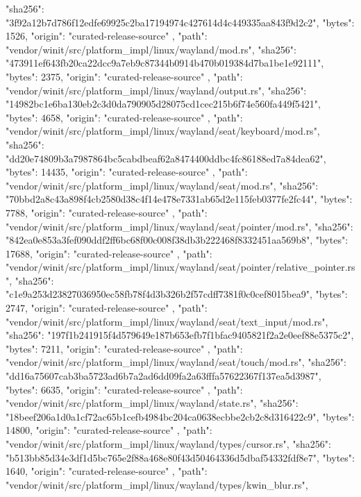 {{      "sha256": "3f92a12b7d786f12edfe69925c2ba17194974c427614d4c449335aa843f9d2c2",
      "bytes": 1526,
      "origin": "curated-release-source"
    },
    {
      "path": "vendor/winit/src/platform_impl/linux/wayland/mod.rs",
      "sha256": "473911ef643fb20ca22dcc9a7eb9c87344b0914b470b019384d7ba1be1e92111",
      "bytes": 2375,
      "origin": "curated-release-source"
    },
    {
      "path": "vendor/winit/src/platform_impl/linux/wayland/output.rs",
      "sha256": "14982bc1e6ba130eb2c3d0da790905d28075cd1cec215b6f74e560fa449f5421",
      "bytes": 4658,
      "origin": "curated-release-source"
    },
    {
      "path": "vendor/winit/src/platform_impl/linux/wayland/seat/keyboard/mod.rs",
      "sha256": "dd20e74809b3a7987864bc5cabdbeaf62a8474400ddbc4fc86188ed7a84dea62",
      "bytes": 14435,
      "origin": "curated-release-source"
    },
    {
      "path": "vendor/winit/src/platform_impl/linux/wayland/seat/mod.rs",
      "sha256": "70bbd2a8c43a898f4cb2580d38c4f14e478e7331ab65d2e115feb0377fe2fc44",
      "bytes": 7788,
      "origin": "curated-release-source"
    },
    {
      "path": "vendor/winit/src/platform_impl/linux/wayland/seat/pointer/mod.rs",
      "sha256": "842ea0e853a3fef090ddf2ff6bc68f00c008f38db3b222468f8332451aa569b8",
      "bytes": 17688,
      "origin": "curated-release-source"
    },
    {
      "path": "vendor/winit/src/platform_impl/linux/wayland/seat/pointer/relative_pointer.rs",
      "sha256": "c1e9a253d23827036950ec58fb78f4d3b326b2f57cdff7381f0c0cef8015bea9",
      "bytes": 2747,
      "origin": "curated-release-source"
    },
    {
      "path": "vendor/winit/src/platform_impl/linux/wayland/seat/text_input/mod.rs",
      "sha256": "197f1b241915f4d579649e187b653efb7f1bfac9405821f2a2e0eef88e5375c2",
      "bytes": 7211,
      "origin": "curated-release-source"
    },
    {
      "path": "vendor/winit/src/platform_impl/linux/wayland/seat/touch/mod.rs",
      "sha256": "dd16a75607cab3ba5723ad6b7a2ad6dd09fa2a63fffa57622367f137ea5d3987",
      "bytes": 6635,
      "origin": "curated-release-source"
    },
    {
      "path": "vendor/winit/src/platform_impl/linux/wayland/state.rs",
      "sha256": "18beef206a1d0a1cf72ac65b1cefb4984bc204ca0638ecbbe2cb2c8d316422c9",
      "bytes": 14800,
      "origin": "curated-release-source"
    },
    {
      "path": "vendor/winit/src/platform_impl/linux/wayland/types/cursor.rs",
      "sha256": "b513bb85d34e3df1d5bc765e2f88a468e80f43d50464336d5dbaf54332fdf8e7",
      "bytes": 1640,
      "origin": "curated-release-source"
    },
    {
      "path": "vendor/winit/src/platform_impl/linux/wayland/types/kwin_blur.rs",
}}

